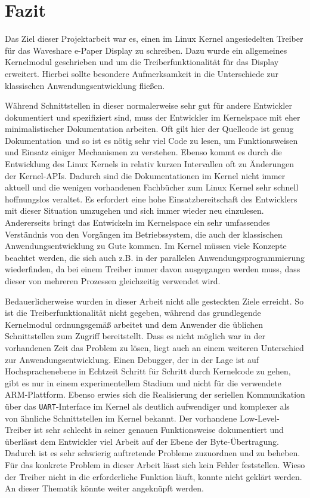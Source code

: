 \chapter{Fazit}
Das Ziel dieser Projektarbeit war es, einen im Linux Kernel angesiedelten Treiber für das Waveshare e-Paper Display zu schreiben. Dazu wurde ein allgemeines Kernelmodul geschrieben und um die Treiberfunktionalität für das Display erweitert.
Hierbei sollte besondere Aufmerksamkeit in die Unterschiede zur klassischen Anwendungsentwicklung fließen. 

Während Schnittstellen in dieser normalerweise sehr gut für andere Entwickler dokumentiert und spezifiziert sind, muss der Entwickler im Kernelspace mit eher minimalistischer Dokumentation arbeiten. Oft gilt hier \glqq der Quellcode ist genug Dokumentation\grqq~und so ist es nötig sehr viel Code zu lesen, um Funktionsweisen und Einsatz einiger Mechanismen zu verstehen. 
Ebenso kommt es durch die Entwicklung des Linux Kernels in relativ kurzen Intervallen oft zu Änderungen der Kernel-APIs. Dadurch sind die Dokumentationen im Kernel nicht immer aktuell und die wenigen vorhandenen Fachbücher zum Linux Kernel sehr schnell hoffnungslos veraltet. Es erfordert eine hohe Einsatzbereitschaft des Entwicklers mit dieser Situation umzugehen und sich immer wieder neu einzulesen. Andererseits bringt das Entwickeln im Kernelspace ein sehr umfassendes Verständnis von den Vorgängen im Betriebssystem, die auch der klassischen Anwendungsentwicklung zu Gute kommen. Im Kernel müssen viele Konzepte beachtet werden, die sich auch z.B. in der parallelen Anwendungsprogrammierung wiederfinden, da bei einem Treiber immer davon ausgegangen werden muss, dass dieser von mehreren Prozessen gleichzeitig verwendet wird.  

Bedauerlicherweise wurden in dieser Arbeit nicht alle gesteckten Ziele erreicht. So ist die Treiberfunktionalität nicht gegeben, während das grundlegende Kernelmodul ordnungsgemäß arbeitet und dem Anwender die üblichen Schnittstellen zum Zugriff bereitstellt. Dass es nicht möglich war in der vorhandenen Zeit das Problem zu lösen, liegt auch an einem weiteren Unterschied zur Anwendungsentwicklung. Einen Debugger, der in der Lage ist auf Hochsprachenebene in Echtzeit Schritt für Schritt durch Kernelcode zu gehen, gibt es nur in einem experimentellem Stadium und nicht für die verwendete ARM-Plattform. Ebenso erwies sich die Realisierung der seriellen Kommunikation über das \texttt{UART}-Interface im Kernel als deutlich aufwendiger und komplexer als von ähnliche Schnittstellen im Kernel bekannt. Der vorhandene Low-Level-Treiber ist sehr schlecht in seiner genauen Funktionsweise dokumentiert und überlässt dem Entwickler viel Arbeit auf der Ebene der Byte-Übertragung. Dadurch ist es sehr schwierig auftretende Probleme zuzuordnen und zu beheben. Für das konkrete Problem in dieser Arbeit lässt sich kein Fehler feststellen. Wieso der Treiber nicht in die erforderliche Funktion läuft, konnte nicht geklärt werden. An dieser Thematik könnte weiter angeknüpft werden. 

